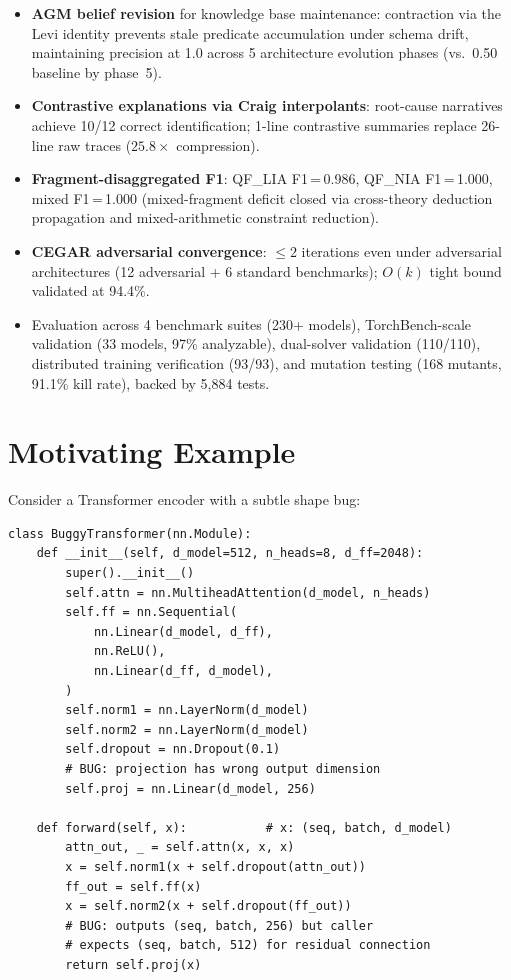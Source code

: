 \documentclass[11pt]{article}
\begin{document}
\begin{itemize}[leftmargin=2em]
    Conv3d, ConvTranspose1d, adaptive pooling, and 42 further operator families.
  \item \textbf{AGM belief revision} for knowledge base maintenance:
    contraction via the Levi identity prevents stale predicate
    accumulation under schema drift, maintaining precision at 1.0
    across 5 architecture evolution phases (vs.\ 0.50 baseline by phase~5).
  \item \textbf{Contrastive explanations via Craig interpolants}:
    root-cause narratives achieve 10/12 correct identification;
    1-line contrastive summaries replace 26-line raw traces
    ($25.8\times$ compression).
  \item \textbf{Fragment-disaggregated F1}: QF\_LIA F1\,=\,0.986,
    QF\_NIA F1\,=\,1.000, mixed F1\,=\,1.000 (mixed-fragment deficit
    closed via cross-theory deduction propagation and
    mixed-arithmetic constraint reduction).
  \item \textbf{CEGAR adversarial convergence}: $\leq 2$ iterations
    even under adversarial architectures (12 adversarial + 6 standard
    benchmarks); $O(k)$ tight bound validated at 94.4\%.
  \item Evaluation across 4 benchmark suites (230+ models),
    TorchBench-scale validation (33 models, 97\% analyzable),
    dual-solver validation (110/110), distributed training verification
    (93/93), and mutation testing (168 mutants, 91.1\% kill rate),
    backed by 5,884 tests.
\end{itemize}


\section{Motivating Example}\label{sec:motivating}

Consider a Transformer encoder with a subtle shape bug:

\begin{lstlisting}[caption={A Transformer with a cross-domain shape bug.},label={lst:motiv}]
class BuggyTransformer(nn.Module):
    def __init__(self, d_model=512, n_heads=8, d_ff=2048):
        super().__init__()
        self.attn = nn.MultiheadAttention(d_model, n_heads)
        self.ff = nn.Sequential(
            nn.Linear(d_model, d_ff),
            nn.ReLU(),
            nn.Linear(d_ff, d_model),
        )
        self.norm1 = nn.LayerNorm(d_model)
        self.norm2 = nn.LayerNorm(d_model)
        self.dropout = nn.Dropout(0.1)
        # BUG: projection has wrong output dimension
        self.proj = nn.Linear(d_model, 256)

    def forward(self, x):           # x: (seq, batch, d_model)
        attn_out, _ = self.attn(x, x, x)
        x = self.norm1(x + self.dropout(attn_out))
        ff_out = self.ff(x)
        x = self.norm2(x + self.dropout(ff_out))
        # BUG: outputs (seq, batch, 256) but caller
        # expects (seq, batch, 512) for residual connection
        return self.proj(x)
\end{lstlisting}
\end{document}
